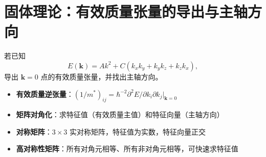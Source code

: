 \section{固体理论：有效质量张量的导出与主轴方向}
\label{sec:effective-mass-tensor}

\begin{modelbox}[题目：各向异性能带极值点的有效质量张量]
若已知
\[
E(\bm{k})=Ak^2+C(k_xk_y+k_yk_z+k_zk_x),
\]
导出 $\bm{k}=0$ 点的有效质量张量，并找出主轴方向。
\end{modelbox}

\begin{tipbox}[考点快速分析]
\begin{itemize}
    \item \textbf{有效质量逆张量}：$(1/m^*)_{ij}=\hbar^{-2}\partial^2E/\partial k_i\partial k_j|_{\bm{k}=0}$
    \item \textbf{矩阵对角化}：求特征值（有效质量主值）和特征向量（主轴方向）
    \item \textbf{对称矩阵}：$3\times3$ 实对称矩阵，特征值为实数，特征向量正交
    \item \textbf{高对称性矩阵}：所有对角元相等、所有非对角元相等，可快速求特征值
\end{itemize}
\end{tipbox}

